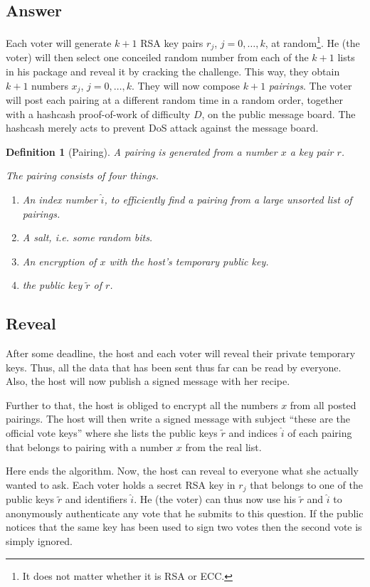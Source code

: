 \documentclass{article}
\newtheorem{defn}[thm]{Definition}
\theoremstyle{definition}
\begin{document}
	\subsection{Answer}
	Each voter will generate $k+1$ RSA key pairs $r_j$, $j=0,\dots,k$, at random\footnote{It does not matter whether it is RSA or ECC.}. He (the voter) will then select one conceiled random number from each of the $k+1$ lists in his package and reveal it by cracking the challenge. This way, they obtain $k+1$ numbers $x_j$, $j=0,\dots,k$. They will now compose $k+1$ \emph{pairings}. The voter will post each pairing at a different random time in a random order, together with a hashcash proof-of-work of difficulty $D$, on the public message board. The hashcash merely acts to prevent DoS attack against the message board.
	
	\begin{defn}[Pairing]
		A pairing is generated from a number $x$ a key pair $r$.
		
		The pairing consists of four things. 
		\begin{enumerate}
			\item An index number $\hat{i}$, to efficiently find a pairing from a large unsorted list of pairings.
			\item A salt, i.e. some random bits.
			\item An encryption of $x$ with the host's temporary public key.
			\item the public key $\tilde{r}$ of $r$.
		\end{enumerate}
	\end{defn}
	
	\subsection{Reveal}
	After some deadline, the host and each voter will reveal their private temporary keys.
	Thus, all the data that has been sent thus far can be read by everyone.
	Also, the host will now publish a signed message with her recipe.
	
	Further to that, the host is obliged to encrypt all the numbers $x$ from all posted pairings.
	The host will then write a signed message with subject ``these are the official vote keys'' where she lists the public keys $\tilde{r}$ and indices $\hat{i}$ of each pairing that belongs to pairing with a number $x$ from the real list.
	
	Here ends the algorithm. Now, the host can reveal to everyone what she actually wanted to ask. Each voter holds a secret RSA key in $r_j$ that belongs to one of the public keys $\tilde{r}$ and identifiers $\hat{i}$. He (the voter) can thus now use his $\tilde{r}$ and $\hat{i}$ to anonymously authenticate any vote that he submits to this question. If the public notices that the same key has been used to sign two votes then the second vote is simply ignored.
	
\end{document}
